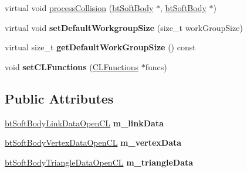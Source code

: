 \begin{DoxyCompactItemize}
\item 
virtual void \hyperlink{classbtOpenCLSoftBodySolver_abab8bf075930d09ce71458e2cab33c93}{process\+Collision} (\hyperlink{classbtSoftBody}{bt\+Soft\+Body} $\ast$, \hyperlink{classbtSoftBody}{bt\+Soft\+Body} $\ast$)
\item 
\mbox{\label{classbtOpenCLSoftBodySolver_af977b199072c53ed3b1fe649257fce95}} 
virtual void {\bfseries set\+Default\+Workgroup\+Size} (size\+\_\+t work\+Group\+Size)
\item 
\mbox{\label{classbtOpenCLSoftBodySolver_afe904e7b8acf17c22db12252035dd8ad}} 
virtual size\+\_\+t {\bfseries get\+Default\+Work\+Group\+Size} () const
\item 
\mbox{\label{classbtOpenCLSoftBodySolver_a121183088db6d037d60602621bf7773f}} 
void {\bfseries set\+C\+L\+Functions} (\hyperlink{classCLFunctions}{C\+L\+Functions} $\ast$funcs)
\end{DoxyCompactItemize}
\subsection*{Public Attributes}
\begin{DoxyCompactItemize}
\item 
\mbox{\label{classbtOpenCLSoftBodySolver_ab64cbdc646d5e2eeb6485df0f14300de}} 
\hyperlink{classbtSoftBodyLinkDataOpenCL}{bt\+Soft\+Body\+Link\+Data\+Open\+CL} {\bfseries m\+\_\+link\+Data}
\item 
\mbox{\label{classbtOpenCLSoftBodySolver_aab38987d486e45f6f630100e7988aeaf}} 
\hyperlink{classbtSoftBodyVertexDataOpenCL}{bt\+Soft\+Body\+Vertex\+Data\+Open\+CL} {\bfseries m\+\_\+vertex\+Data}
\item 
\mbox{\label{classbtOpenCLSoftBodySolver_a8ed9baf61ccd15935e754e39a64d74ab}} 
\hyperlink{classbtSoftBodyTriangleDataOpenCL}{bt\+Soft\+Body\+Triangle\+Data\+Open\+CL} {\bfseries m\+\_\+triangle\+Data}
\end{DoxyCompactItemize}
